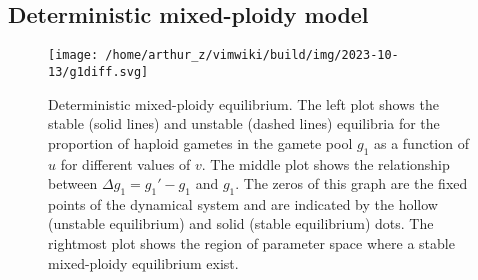 \hypertarget{sec:det}{%
\subsection{Deterministic mixed-ploidy model}\label{sec:det}}

\begin{figure}
\centering
\texttt{[image: /home/arthur\_z/vimwiki/build/img/2023-10-13/g1diff.svg]}
\caption{Deterministic mixed-ploidy equilibrium. The left plot shows the
stable (solid lines) and unstable (dashed lines) equilibria for the
proportion of haploid gametes in the gamete pool \(g_1\) as a function
of \(u\) for different values of \(v\). The middle plot shows the
relationship between \(\Delta g_1 = g_1' - g_1\) and \(g_1\). The zeros
of this graph are the fixed points of the dynamical system and are
indicated by the hollow (unstable equilibrium) and solid (stable
equilibrium) dots. The rightmost plot shows the region of parameter
space where a stable mixed-ploidy equilibrium exist. \label{fig:g1diff}}
\end{figure}


